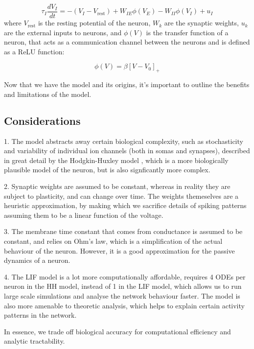 \documentclass[10pt,twocolumn]{article}
\begin{document}
\begin{equation}
    \tau_I \frac{dV_I}{dt} = 
    -(V_I - V_{\text{rest}}) 
    + W_{IE} \phi(V_E) 
    - W_{II} \phi(V_I) + u_I
\end{equation}
where $V_{\text{rest}}$ is the resting potential of the neuron, $W_{k}$ are the 
synaptic weights, $u_k$ are the external inputs to neurons, 
and $\phi(V)$ is the transfer function of a neuron, that acts as 
a communication channel between the neurons and is defined as a ReLU function:

\begin{equation}
    \phi(V) = \beta[V-V_0]_+
\end{equation}

Now that we have the model and its origins, it's important to outline 
the benefits and limitations of the model.

\subsection{Considerations}
1. The model abstracts away certain biological complexity, such as stochasticity and
variability of individual ion channels (both in somas and synapses), described in
great detail by the Hodgkin-Huxley model \cite{hodgkin1952quantitative}, which is
a more biologically plausible model of the neuron, 
but is also signficantly more complex.

2. Synaptic weights are assumed to be constant, whereas in reality they are subject to
plasticity, and can change over time.
The weights themeselves are a heuristic approximation, 
by making which we sacrifice details of 
spiking patterns assuming them to be a linear function of the voltage.

3. The membrane time constant that comes from conductance is assumed to be constant,
and relies on Ohm's law, which is a simplification of the actual behaviour of the neuron.
However, it is a good approximation for the passive dynamics of a neuron.  

4. The LIF model is a lot more computationally affordable, requires 4 ODEs
per neuron in the HH model, instead of 1 in the LIF model, 
which allows us to run large scale simulations and analyse 
the network behaviour faster. The model is also more amenable 
to theoretic analysis, which helps to explain certain activity patterns in the network.

In essence, we trade off biological accuracy for 
computational efficiency and analytic tractability.
\end{document}
